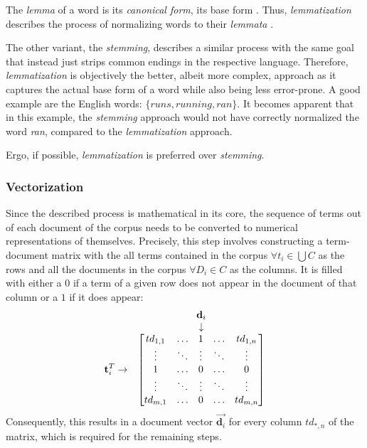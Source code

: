 \documentclass[12pt,a4paper]{report}
\begin{document}
The \textit{lemma} of a word is its \textit{canonical form}, its base form
\cite{plisson2004lemma}. Thus, \textit{lemmatization} describes the process of
normalizing words to their \textit{lemmata} \cite{plisson2004lemma}.

The other variant, the \textit{stemming}, describes a similar process with the
same goal that instead just strips common endings in the respective language.
Therefore, \textit{lemmatization} is objectively the better, albeit more
complex, approach as it captures the actual base form of a word while also
being less error-prone. A good example are the English words: \(\{\textit{
runs}, \textit{running}, \textit{ran}\}\). It becomes apparent that in this
example, the \textit{stemming} approach would not have correctly normalized the
word \textit{ran}, compared to the \textit{lemmatization} approach.

Ergo, if possible, \textit{lemmatization} is preferred over \textit{stemming}.


\subsubsection{Vectorization}
Since the described process is mathematical in
its core, the sequence of terms out of each document of the corpus needs to be
converted to numerical representations of themselves. Precisely, this step
involves constructing a term-document matrix with the all terms contained in
the corpus \(\forall t_i \in \bigcup C\) as the rows and all the documents in
the corpus \(\forall D_i \in C\) as the columns. It is filled with either a
\(0\) if a term of a given row does not appear in the document of that column or
a \(1\) if it does appear:
\[
  \begin{matrix}
    & \textbf d_i \\
    & \downarrow \\
    \textbf t_i^{T} \rightarrow &
    \begin{bmatrix}
      td_{1,1}  & \dots   & 1       & \dots   & td_{1,n}  \\
      \vdots    & \ddots  & \vdots  & \ddots  & \vdots    \\
      1         & \dots   & 0       & \dots   & 0         \\
      \vdots    & \ddots  & \vdots  & \ddots  & \vdots    \\
      td_{m,1}  & \dots   & 0       & \dots   & td_{m,n}  \\
    \end{bmatrix}
  \end{matrix}
\]
Consequently, this results in a document vector \(\vec{\mathbf d_i}\)
for every column \(td_{*,n}\) of the matrix, which is required for the remaining steps.
\end{document}
